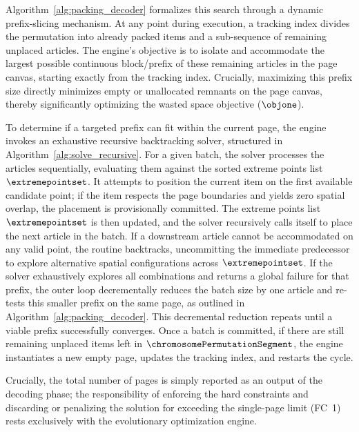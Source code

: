 Algorithm~\ref{alg:packing_decoder} formalizes this search through a dynamic prefix-slicing mechanism. At any point during execution, a tracking index divides the permutation into already packed items and a sub-sequence of remaining unplaced articles. The engine's objective is to isolate and accommodate the largest possible continuous block/prefix of these remaining articles in the page canvas, starting exactly from the tracking index. Crucially, maximizing this prefix size directly minimizes empty or unallocated remnants on the page canvas, thereby significantly optimizing the wasted space objective ($\objone$).

To determine if a targeted prefix can fit within the current page, the engine invokes an exhaustive recursive backtracking solver, structured in Algorithm~\ref{alg:solve_recursive}. For a given batch, the solver processes the articles sequentially, evaluating them against the sorted extreme points list $\extremepointset$. It attempts to position the current item on the first available candidate point; if the item respects the page boundaries and yields zero spatial overlap, the placement is provisionally committed. The extreme points list $\extremepointset$ is then updated, and the solver recursively calls itself to place the next article in the batch. If a downstream article cannot be accommodated on any valid point, the routine backtracks, uncommitting the immediate predecessor to explore alternative spatial configurations across $\extremepointset$. If the solver exhaustively explores all combinations and returns a global failure for that prefix, the outer loop decrementally reduces the batch size by one article and re-tests this smaller prefix on the same page, as outlined in Algorithm~\ref{alg:packing_decoder}. This decremental reduction repeats until a viable prefix successfully converges. Once a batch is committed, if there are still remaining unplaced items left in $\chromosomePermutationSegment$, the engine instantiates a new empty page, updates the tracking index, and restarts the cycle.

Crucially, the total number of pages is simply reported as an output of the decoding phase; the responsibility of enforcing the hard constraints and discarding or penalizing the solution for exceeding the single-page limit (FC~1) rests exclusively with the evolutionary optimization engine.





